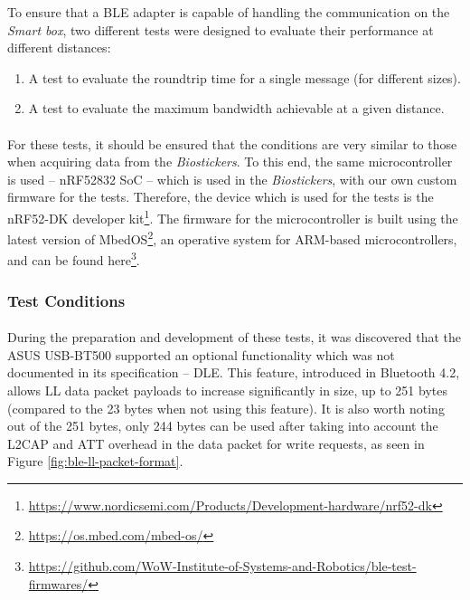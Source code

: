 To ensure that a \acs{BLE} adapter is capable of handling the communication on the \textit{Smart box}, two different tests were designed to evaluate their performance at different distances: 

\renewcommand{\labelenumi}{\textit{\alph{enumi})}}

\begin{enumerate}
    \item A test to evaluate the roundtrip time for a single message (for different sizes).
    \item A test to evaluate the maximum bandwidth achievable at a given distance. 
\end{enumerate}
\renewcommand{\labelenumi}{\arabic{enumi}.}

\paragraph{} For these tests, it should be ensured that the conditions are very similar to those when acquiring data from the \textit{Biostickers}. To this end, the same microcontroller is used -- nRF52832 \acs{SoC} -- which is used in the \textit{Biostickers}, with our own custom firmware for the tests. Therefore, the device which is used for the tests is the nRF52-DK developer kit\footnote{\url{https://www.nordicsemi.com/Products/Development-hardware/nrf52-dk}}. The firmware for the microcontroller is built using the latest version of MbedOS\footnote{\url{https://os.mbed.com/mbed-os/}}, an operative system for ARM-based microcontrollers, and can be found here\footnote{\url{https://github.com/WoW-Institute-of-Systems-and-Robotics/ble-test-firmwares/}}.

\subsubsection{Test Conditions}
\label{sec:ble_test_conditions}
\paragraph{} During the preparation and development of these tests, it was discovered that the ASUS USB-BT500 supported an optional functionality which was not documented in its specification -- \acf{DLE}. This feature, introduced in Bluetooth 4.2, allows \acs{LL} data packet payloads to increase significantly in size, up to 251 bytes (compared to the 23 bytes when not using this feature). It is also worth noting out of the 251 bytes, only 244 bytes can be used after taking into account the \acs{L2CAP} and \acs{ATT} overhead in the data packet for write requests, as seen in Figure \ref{fig:ble-ll-packet-format}.

